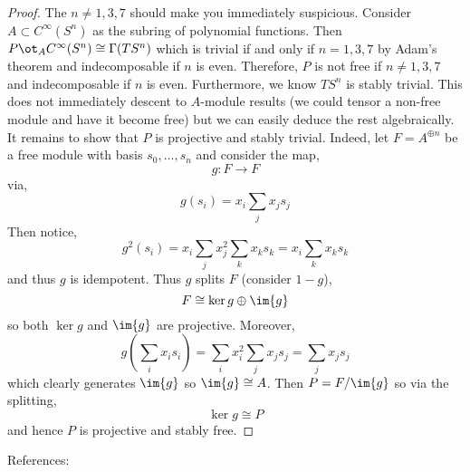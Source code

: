 \documentclass[12pt]{article}
\begin{document}
\begin{proof}
The $n \neq 1,3,7$ should make you immediately suspicious. Consider $A \subset C^{\infty}(S^n)$ as the subring of polynomial functions. Then $P \ot_A C^{\infty}(S^n) \cong \Gamma(T S^n)$ which is trivial if and only if $n = 1, 3, 7$ by Adam's theorem and indecomposable if $n$ is even. Therefore, $P$ is not free if $n \neq 1,3,7$ and indecomposable if $n$ is even. Furthermore, we know $T S^n$ is stably trivial. This does not immediately descent to $A$-module results (we could tensor a non-free module and have it become free) but we can easily deduce the rest algebraically.
\bigskip\\
It remains to show that $P$ is projective and stably trivial. Indeed, let $F = A^{\oplus n}$ be a free module with basis $s_0, \dots, s_n$ and consider the map,
\[ g : F \to F \]
via,
\[ g(s_i) = x_i \sum_{j} x_j s_j \]
Then notice,
\[ g^2(s_i) = x_i \sum_j x_j^2 \sum_k x_k s_k = x_i \sum_k x_k s_k \]
and thus $g$ is idempotent. Thus $g$ splits $F$ (consider $1-g$),
\[ F \cong \ker{g} \oplus \im{g} \]
so both $\ker{g}$ and $\im{g}$ are projective. Moreover,
\[ g \left( \sum_i x_i s_i \right) = \sum_i x_i^2 \sum_j x_j s_j = \sum_j x_j s_j \]
which clearly generates $\im{g}$ so $\im{g} \cong A$. Then $P = F / \im{g}$ so via the splitting,
\[ \ker{g} \cong P \]
and hence $P$ is projective and stably free. 
\end{proof}

References:
\end{document}
